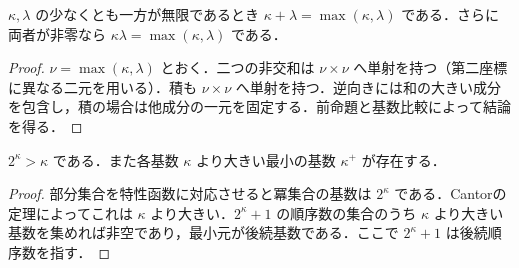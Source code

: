 \begin{prop}[無限基数の和と積]
$\kappa,\lambda$ の少なくとも一方が無限であるとき $\kappa+\lambda=\max(\kappa,\lambda)$ である．さらに両者が非零なら $\kappa\lambda=\max(\kappa,\lambda)$ である．
\end{prop}
\begin{proof}
$\nu=\max(\kappa,\lambda)$ とおく．二つの非交和は $\nu\times\nu$ へ単射を持つ（第二座標に異なる二元を用いる）．積も $\nu\times\nu$ へ単射を持つ．逆向きには和の大きい成分を包含し，積の場合は他成分の一元を固定する．前命題と基数比較によって結論を得る．
\end{proof}
\begin{prop}[冪集合と後続基数]
$2^\kappa>\kappa$ である．また各基数 $\kappa$ より大きい最小の基数 $\kappa^+$ が存在する．
\end{prop}
\begin{proof}
部分集合を特性函数に対応させると冪集合の基数は $2^\kappa$ である．Cantorの定理によってこれは $\kappa$ より大きい．$2^\kappa+1$ の順序数の集合のうち $\kappa$ より大きい基数を集めれば非空であり，最小元が後続基数である．ここで $2^\kappa+1$ は後続順序数を指す．
\end{proof}
